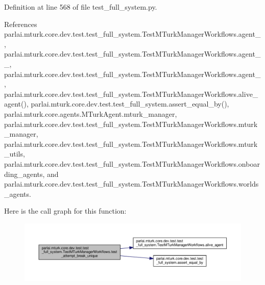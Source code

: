 Definition at line 568 of file test\+\_\+full\+\_\+system.\+py.



References parlai.\+mturk.\+core.\+dev.\+test.\+test\+\_\+full\+\_\+system.\+Test\+M\+Turk\+Manager\+Workflows.\+agent\+\_, parlai.\+mturk.\+core.\+dev.\+test.\+test\+\_\+full\+\_\+system.\+Test\+M\+Turk\+Manager\+Workflows.\+agent\+\_\+\_, parlai.\+mturk.\+core.\+dev.\+test.\+test\+\_\+full\+\_\+system.\+Test\+M\+Turk\+Manager\+Workflows.\+agent\+\_, parlai.\+mturk.\+core.\+dev.\+test.\+test\+\_\+full\+\_\+system.\+Test\+M\+Turk\+Manager\+Workflows.\+alive\+\_\+agent(), parlai.\+mturk.\+core.\+dev.\+test.\+test\+\_\+full\+\_\+system.\+assert\+\_\+equal\+\_\+by(), parlai.\+mturk.\+core.\+agents.\+M\+Turk\+Agent.\+mturk\+\_\+manager, parlai.\+mturk.\+core.\+dev.\+test.\+test\+\_\+full\+\_\+system.\+Test\+M\+Turk\+Manager\+Workflows.\+mturk\+\_\+manager, parlai.\+mturk.\+core.\+dev.\+test.\+test\+\_\+full\+\_\+system.\+Test\+M\+Turk\+Manager\+Workflows.\+mturk\+\_\+utils, parlai.\+mturk.\+core.\+dev.\+test.\+test\+\_\+full\+\_\+system.\+Test\+M\+Turk\+Manager\+Workflows.\+onboarding\+\_\+agents, and parlai.\+mturk.\+core.\+dev.\+test.\+test\+\_\+full\+\_\+system.\+Test\+M\+Turk\+Manager\+Workflows.\+worlds\+\_\+agents.

Here is the call graph for this function\+:
\nopagebreak
\begin{figure}[H]
\begin{center}
\leavevmode
\includegraphics[width=350pt]{classparlai_1_1mturk_1_1core_1_1dev_1_1test_1_1test__full__system_1_1TestMTurkManagerWorkflows_af8fb1855f1850953ad500543b1a4ff5c_cgraph}
\end{center}
\end{figure}
\mbox{\label{classparlai_1_1mturk_1_1core_1_1dev_1_1test_1_1test__full__system_1_1TestMTurkManagerWorkflows_a78cac9cd90bba3563697fa94ae202d85}} 
